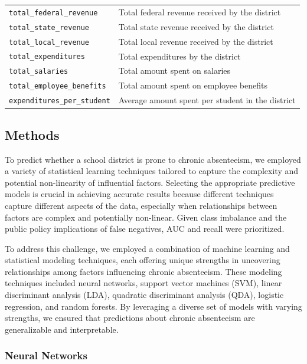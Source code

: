 \documentclass[
  11pt,
]{article}
\begin{document}
\begin{longtable}[]{@{}
  >{\raggedright\arraybackslash}p{}
  >{\raggedright\arraybackslash}p{}@{}}
\texttt{total\_federal\_revenue} & Total federal revenue received by the
district \\
\texttt{total\_state\_revenue} & Total state revenue received by the
district \\
\texttt{total\_local\_revenue} & Total local revenue received by the
district \\
\texttt{total\_expenditures} & Total expenditures by the district \\
\texttt{total\_salaries} & Total amount spent on salaries \\
\texttt{total\_employee\_benefits} & Total amount spent on employee
benefits \\
\texttt{expenditures\_per\_student} & Average amount spent per student
in the district \\
\end{longtable}

\endgroup

\subsection{Methods}\label{methods}

To predict whether a school district is prone to chronic absenteeism, we
employed a variety of statistical learning techniques tailored to
capture the complexity and potential non-linearity of influential
factors. Selecting the appropriate predictive models is crucial in
achieving accurate results because different techniques capture
different aspects of the data, especially when relationships between
factors are complex and potentially non-linear. Given class imbalance
and the public policy implications of false negatives, AUC and recall
were prioritized.

To address this challenge, we employed a combination of machine learning
and statistical modeling techniques, each offering unique strengths in
uncovering relationships among factors influencing chronic absenteeism.
These modeling techniques included neural networks, support vector
machines (SVM), linear discriminant analysis (LDA), quadratic
discriminant analysis (QDA), logistic regression, and random forests. By
leveraging a diverse set of models with varying strengths, we ensured
that predictions about chronic absenteeism are generalizable and
interpretable.

\subsubsection{Neural Networks}\label{neural-networks}
\end{document}
